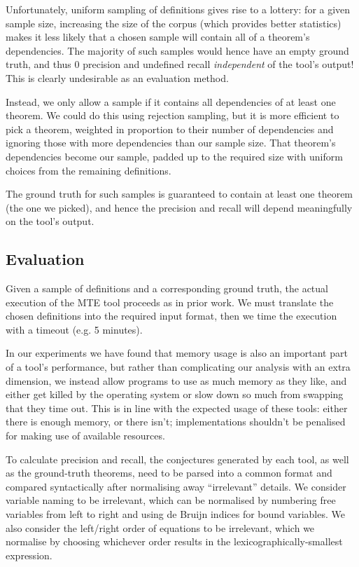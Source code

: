 Unfortunately, uniform sampling of definitions gives rise to a lottery: for a
given sample size, increasing the size of the corpus (which provides better
statistics) makes it less likely that a chosen sample will contain all of
a theorem's dependencies. The majority of such samples would hence have an empty
ground truth, and thus $0$ precision and undefined recall \emph{independent} of
the tool's output! This is clearly undesirable as an evaluation method.

Instead, we only allow a sample if it contains all dependencies of at least one
theorem. We could do this using rejection sampling, but it is more efficient to
pick a theorem, weighted in proportion to their number of dependencies and
ignoring those with more dependencies than our sample size. That theorem's
dependencies become our sample, padded up to the required size with uniform
choices from the remaining definitions.

The ground truth for such samples is guaranteed to contain at least one theorem
(the one we picked), and hence the precision and recall will depend meaningfully
on the tool's output.

\subsection{Evaluation}

Given a sample of definitions and a corresponding ground truth, the actual
execution of the MTE tool proceeds as in prior work. We must translate the
chosen definitions into the required input format, then we time the execution
with a timeout (e.g. 5 minutes).

In our experiments we have found that memory usage is also an important part of
a tool's performance, but rather than complicating our analysis with an extra
dimension, we instead allow programs to use as much memory as they like, and
either get killed by the operating system or slow down so much from swapping
that they time out. This is in line with the expected usage of these tools:
either there is enough memory, or there isn't; implementations shouldn't be
penalised for making use of available resources.

To calculate precision and recall, the conjectures generated by each tool, as
well as the ground-truth theorems, need to be parsed into a common format and
compared syntactically after normalising away ``irrelevant'' details. We
consider variable naming to be irrelevant, which can be normalised by numbering
free variables from left to right and using de Bruijn indices for bound
variables. We also consider the left/right order of equations to be irrelevant,
which we normalise by choosing whichever order results in the
lexicographically-smallest expression.

